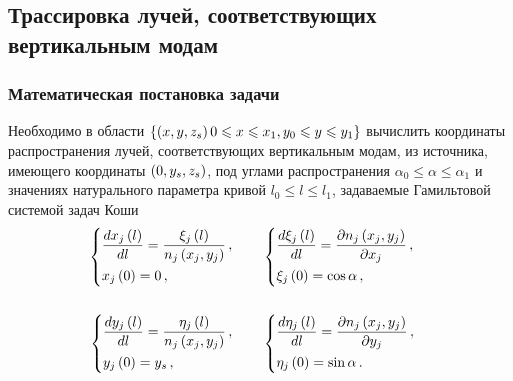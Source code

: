 \documentclass[../document.tex]{subfiles}
\begin{document}
		\subsection{Трассировка лучей, соответствующих вертикальным модам\label{sec::horizontal_rays}}
			\subsubsection{Математическая постановка задачи}
				\par Необходимо в области $\left\{\left(x,y,z_s\right)0\leqslant x\leqslant x_1,y_0\leqslant y\leqslant y_1\right\}$ вычислить координаты распространения лучей, соответствующих вертикальным модам, из источника, имеющего координаты $\left(0,y_s,z_s\right)$, под углами распространения $\alpha_0\leqslant\alpha\leqslant\alpha_1$ и значениях натурального параметра кривой $l_0\leqslant l\leqslant l_1$, задаваемые Гамильтовой системой задач Коши
				\begin{equation}
					\begin{aligned}
						\begin{dcases}
							\frac{dx_j\left(l\right)}{dl}=\frac{\xi_j\left(l\right)}{n_j\left(x_j,y_j\right)}\,,\\
							x_j\left(0\right)=0\,,
						\end{dcases}&\qquad
						\begin{dcases}
							\frac{d\xi_j\left(l\right)}{dl}=\frac{\partial n_j\left(x_j,y_j\right)}{\partial x_j}\,,\\
							\xi_j\left(0\right)=\cos\alpha\,,
						\end{dcases}\\
						&&\\
						\begin{dcases}
							\frac{dy_j\left(l\right)}{dl}=\frac{\eta_j\left(l\right)}{n_j\left(x_j,y_j\right)}\,,\\
							y_j\left(0\right)=y_s\,,
						\end{dcases}&\qquad
						\begin{dcases}
							\frac{d\eta_j\left(l\right)}{dl}=\frac{\partial n_j\left(x_j,y_j\right)}{\partial y_j}\,,\\
							\eta_j\left(0\right)=\sin\alpha\,.
						\end{dcases}
					\end{aligned}
				\end{equation}
\end{document}
